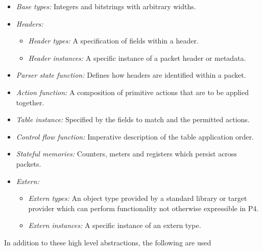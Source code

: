 \documentclass[12pt]{article}
\begin{document}
\begin{itemize}

\item
\textit{Base types:} Integers and bitstrings with arbitrary widths.
\item
\textit{Headers:}
\begin{itemize}
\item
\textit{Header types:} A specification of fields within a header.
\item
\textit{Header instances:} A specific instance of a packet header or metadata.
\end{itemize}
\item
\textit{Parser state function:} Defines how headers are identified
within a packet.
\item
\textit{Action function:} A composition of primitive actions that are to be applied 
together.
\item
\textit{Table instance:} Specified by the fields to match and the permitted actions.
\item
\textit{Control flow function:} Imperative description of the table application
order. 
\item
\textit{Stateful memories:} Counters, meters and registers which persist across packets.
\item
\textit{Extern:}
\begin{itemize}
\item
\textit{Extern types:} An object type provided by a standard library 
or target provider which can perform functionality not otherwise expressible
in P4.
\item
\textit{Extern instances:} A specific instance of an extern type.
\end{itemize}

\end{itemize}

In addition to these high level abstractions, the following are used
\end{document}
